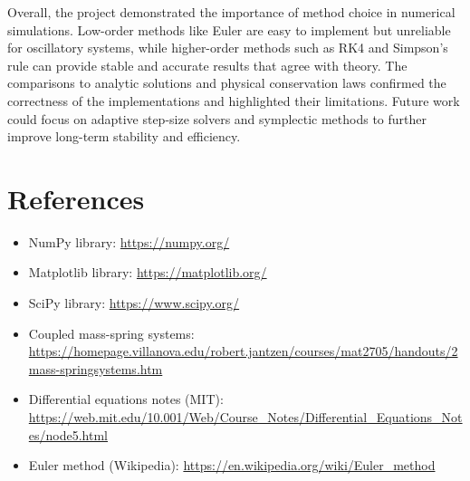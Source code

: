 \documentclass[12pt]{article}
\begin{document}
Overall, the project demonstrated the importance of method choice in numerical simulations. Low-order methods like Euler are easy to implement but unreliable for oscillatory systems, while higher-order methods such as RK4 and Simpson’s rule can provide stable and accurate results that agree with theory. The comparisons to analytic solutions and physical conservation laws confirmed the correctness of the implementations and highlighted their limitations. Future work could focus on adaptive step-size solvers and symplectic methods to further improve long-term stability and efficiency.

\section{References}
\begin{itemize}
    \item NumPy library: \url{https://numpy.org/}
    \item Matplotlib library: \url{https://matplotlib.org/}
    \item SciPy library: \url{https://www.scipy.org/}
    \item Coupled mass-spring systems: \url{https://homepage.villanova.edu/robert.jantzen/courses/mat2705/handouts/2mass-springsystems.htm}
    \item Differential equations notes (MIT): \url{https://web.mit.edu/10.001/Web/Course_Notes/Differential_Equations_Notes/node5.html}
    \item Euler method (Wikipedia): \url{https://en.wikipedia.org/wiki/Euler_method}
\end{itemize}
\end{document}
